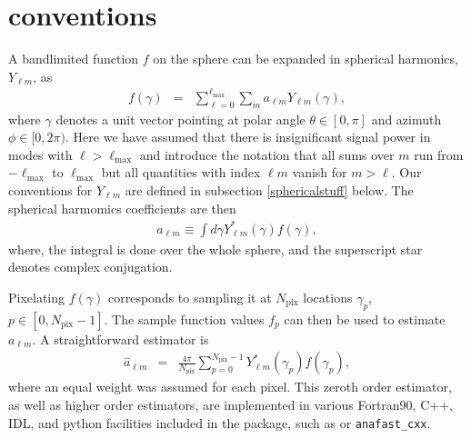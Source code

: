 \documentclass[12pt,twoside]{article}
\newcommand{\myhtmlimage}[1]{ }
\newcommand{\myequal}{=}
\renewcommand{\myequal}{=} %
\newcommand{\npix}{N_{\mathrm{pix}}}
\newcommand{\lmax}{\ell_{\mathrm{max}}}
\begin{document}
\section{\healpix conventions}
\label{sec:conventions}%
A bandlimited function $f$ on the sphere can
be expanded in spherical harmonics, $Y_{\ell m}$,
as
\begin{eqnarray}
  \label{eq:alms}
  f({ \gamma}) &=& \sum_{\ell =0}^{\lmax}\sum_{m}a_{\ell m}Y_{\ell m}(\gamma),%
\end{eqnarray}
where ${{\gamma}}$ denotes a unit vector pointing at polar angle $\theta\in[0,\pi]$ and
azimuth $\phi\in[0,2\pi)$. Here we have assumed that there is insignificant signal power in modes
with $\ell>\lmax$ and introduce the  notation that all sums over $m$ run from
$-\lmax$ to $\lmax$ but all quantities with index ${\ell m}$ vanish
for $m>\ell$. Our conventions for $Y_{\ell m}$ are defined in subsection
\ref{sphericalstuff} below.
The spherical harmomics coefficients are then
\begin{eqnarray}
	a_{\ell m} \equiv \int d\gamma Y^\ast_{\ell m}(\gamma) f(\gamma),\myhtmlimage{}\label{eq:alms_def}
\end{eqnarray}
where, the integral is done over the whole sphere, 
and the superscript star denotes complex  conjugation.

Pixelating $f({\gamma})$ corresponds to sampling it at $\npix$
 locations $\gamma_{p}$, $p\in[0,\npix-1]$. The sample
function values $f_p$ can then be used  
to estimate  $a_{\ell m}$.
A straightforward estimator is
\begin{eqnarray}
  \hat{a}_{\ell m} &=& \frac{4\pi}{\npix}\sum_{p=0}^{\npix-1}
  Y^\ast_{\ell m}(\gamma_p) f(\gamma_p),\myhtmlimage{}\label{eq:hata}
\end{eqnarray}
where an equal weight was assumed for each pixel. This
zeroth order estimator, as well as  higher order  estimators, are implemented in various
Fortran90, C++, IDL, and python facilities included in the package, 
such as  or \texttt{anafast\_cxx}.
\end{document}
